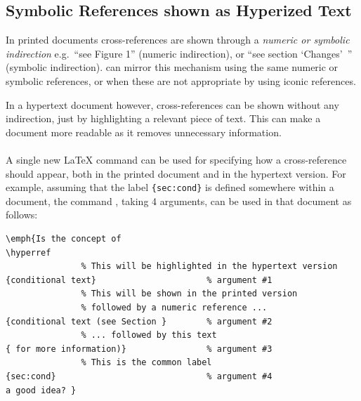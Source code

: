 \subsection{Symbolic References shown as Hyperized Text\label{hyperized}%
}%
\tableofchildlinks*
{}%
%
%
\html{\\}\noindent
In printed documents cross-references are shown 
through a \emph{numeric or symbolic indirection} 
e.g.\ ``see Figure 1'' (numeric indirection), 
or ``see section `Changes'~'' (symbolic indirection).  
\latextohtml{} can mirror this mechanism using the same numeric 
or symbolic references,
or when these are not appropriate by using iconic references.

%
\html{\\}%
In a hypertext document however, cross-references can be shown 
without any indirection, just by highlighting a relevant piece of text. 
This can make a document more readable as it removes unnecessary
information. 

%
\paragraph*{\label{hyperref}}
A single new \LaTeX{} command  can be used for
specifying how a cross-reference should appear, 
both in the printed document and in the hypertext version.
For example, assuming that the label \verb|{sec:cond}|\label{sec:cond} 
is defined somewhere within a document, 
the command , taking 4 arguments,
can be used in that document as follows:
%
%
\begin{small}
\begin{verbatim}
\emph{Is the concept of
\hyperref
               % This will be highlighted in the hypertext version
{conditional text}                      % argument #1
               % This will be shown in the printed version 
               % followed by a numeric reference ...      
{conditional text (see Section }        % argument #2
               % ... followed by this text
{ for more information)}                % argument #3
               % This is the common label 
{sec:cond}                              % argument #4
a good idea? }
\end{verbatim}
\end{small}

